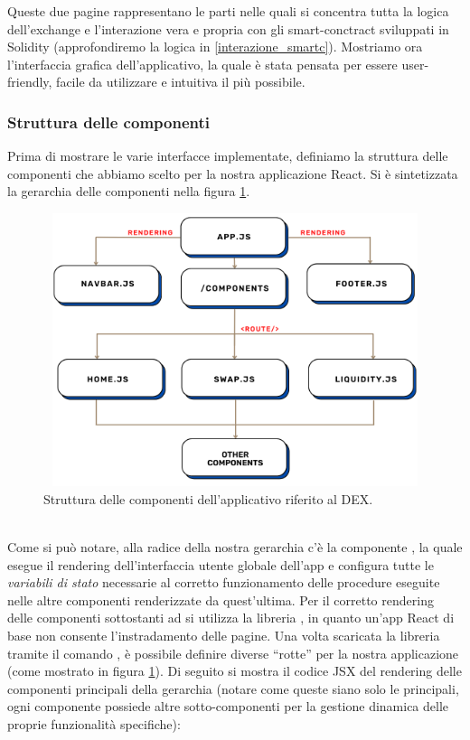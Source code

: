 Queste due pagine rappresentano le parti nelle quali si concentra tutta la logica dell'exchange e l'interazione vera e propria con gli smart-conctract sviluppati in Solidity (approfondiremo la logica in \ref{interazione_smartc}).
Mostriamo ora l'interfaccia grafica dell'applicativo, la quale è stata pensata per essere user-friendly, facile da utilizzare e intuitiva il più possibile.

\subsubsection{Struttura delle componenti}\label{Struttura_componenti}

Prima di mostrare le varie interfacce implementate, definiamo la struttura delle componenti che abbiamo scelto per la nostra applicazione React. Si è sintetizzata la gerarchia delle componenti nella figura \ref{struttura_componenti}.
\begin{figure}[h]
    \centering
    \includegraphics[width=14cm,height=8cm]{Immagini/StrutturaComponenti.png}
    \caption[Albero delle componenti dell'applicativo riferito all'exchange]{Struttura delle componenti dell'applicativo riferito al DEX.}
    \label{struttura_componenti}
\end{figure}
\\Come si può notare, alla radice della nostra gerarchia c'è la componente , la quale esegue il rendering dell'interfaccia utente globale dell'app e configura tutte le \textit{variabili di stato} necessarie al corretto funzionamento delle procedure eseguite nelle altre componenti renderizzate da quest'ultima. Per il corretto rendering delle componenti sottostanti ad  si utilizza la libreria , in quanto un'app React di base non consente l'instradamento delle pagine. Una volta scaricata la libreria tramite il comando , è possibile definire diverse “rotte” per la nostra applicazione (come mostrato in figura \ref{struttura_componenti}).
Di seguito si mostra il codice JSX del rendering delle componenti principali della gerarchia (notare come queste siano solo le principali, ogni componente possiede altre sotto-componenti per la gestione dinamica delle proprie funzionalità specifiche):\\


